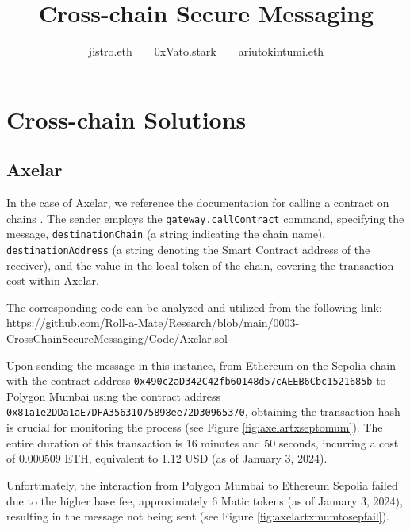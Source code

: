 \documentclass[fleqn,10pt]{olplainarticle}
\title{Cross-chain Secure Messaging}
\author[1]{jistro.eth~~~~0xVato.stark~~~~ariutokintumi.eth}
\begin{document}
\flushbottom
\maketitle
\thispagestyle{empty}

\tableofcontents

\section{Cross-chain Solutions}

\subsection{Axelar}

In the case of Axelar, we reference the documentation for calling a contract on chains \cite{axelar_axelar_nodate}. The sender employs the \texttt{gateway.callContract} command, specifying the message, \texttt{destinationChain} (a string indicating the chain name), \texttt{destinationAddress} (a string denoting the Smart Contract address of the receiver), and the value in the local token of the chain, covering the transaction cost within Axelar.

The corresponding code can be analyzed and utilized from the following link: \url{https://github.com/Roll-a-Mate/Research/blob/main/0003-CrossChainSecureMessaging/Code/Axelar.sol}

Upon sending the message in this instance, from Ethereum on the Sepolia chain with the contract address \texttt{0x490c2aD342C42fb60148d57cAEEB6Cbc1521685b} to Polygon Mumbai using the contract address \texttt{0x81a1e2DDa1aE7DFA35631075898ee72D30965370}, obtaining the transaction hash is crucial for monitoring the process (see Figure \ref{fig:axelartxseptomum}). The entire duration of this transaction is 16 minutes and 50 seconds, incurring a cost of 0.000509 ETH, equivalent to 1.12 USD (as of January 3, 2024).


Unfortunately, the interaction from Polygon Mumbai to Ethereum Sepolia failed due to the higher base fee, approximately 6 Matic tokens (as of January 3, 2024), resulting in the message not being sent (see Figure \ref{fig:axelartxmumtosepfail}).
\end{document}

